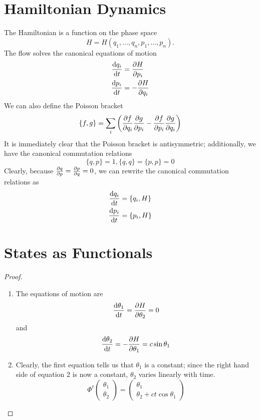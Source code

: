 \begin{revision}
	\section*{Hamiltonian Dynamics}
The Hamiltonian is a function on the phase space
\[H = H(q_1, \dots, q_n, p_1, \dots, p_n).\]
The flow solves the canonical equations of motion
\begin{align*}
\dv{q_i}{t} &= \pdv{H}{p_i}\\
\dv{p_i}{t} &= -\pdv{H}{q_i}
\end{align*}
We can also define the Poisson bracket
\[\{f,g\} = \sum_i \left(\pdv{f}{q_i}\pdv{g}{p_i} - \pdv{f}{p_i}\pdv{g}{q_i}\right)\]
It is immediately clear that the Poisson bracket is antisymmetric; additionally, we have the canonical commutation relations
\[\{q,p\}= 1, \{q,q\}=\{p,p\}=0\]
Clearly, because $\pdv{q}{p} = \pdv{p}{q} = 0$, we can rewrite the canonical commutation relations as
\begin{align*}
	\dv{q_i}{t} &= \{q_i, H\}\\
	\dv{p_i}{t} &= \{p_i, H\}
\end{align*}
\section*{States as Functionals}
\end{revision}
\begin{proof}
	\begin{enumerate}
		\item The equations of motion are
		\[\dv{\theta_1}{t} = \pdv{H}{\theta_2}=0\]
		and 
		\[\dv{\theta_2}{t} = -\pdv{H}{\theta_1}=c\sin\theta_1\]
		\item Clearly, the first equation tells us that $\theta_1$ is a constant; since the right hand side of equation 2 is now a constant, $\theta_2$ varies linearly with time.
		\[\Phi^t \begin{pmatrix}
			\theta_1 \\ \theta_2
		\end{pmatrix} = \begin{pmatrix}
		\theta_1 \\ \theta_2 + ct\cos\theta_1
	\end{pmatrix}\]
	\end{enumerate}
\end{proof}
